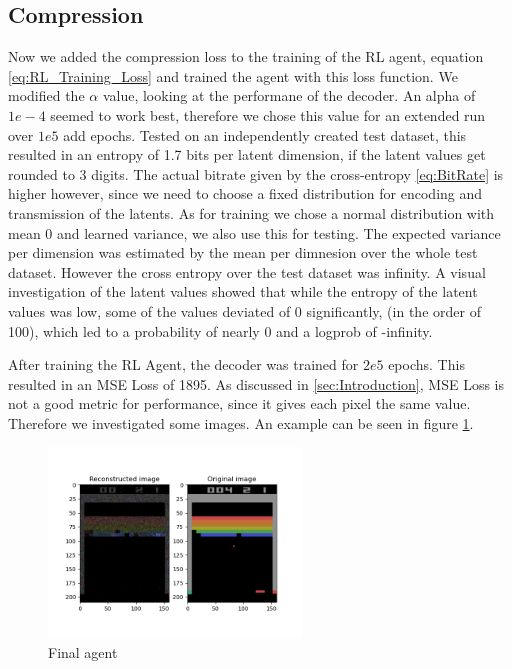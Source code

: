 \subsection{Compression}\label{sub:Results_Compression}
Now we added the compression loss to the training of the RL agent, equation
\ref{eq:RL_Training_Loss} and trained the agent with this loss function. We
modified the $\alpha$ value, looking at the performane of the decoder. An alpha
of $1e-4$ seemed to work best, therefore we chose this value for an
extended run over $1e5$ add epochs. Tested on an independently created test
dataset, this resulted in an entropy of 1.7 bits per latent dimension, if the
latent values get rounded to 3 digits. The actual bitrate given by the
cross-entropy \ref{eq:BitRate} is higher however, since we need to choose a
fixed distribution for encoding and transmission of the latents. As for training
we chose a normal distribution with mean 0 and learned variance, we also use
this for testing. The expected variance per dimension was estimated by the mean
per dimnesion over the whole test dataset. However the cross entropy over the
test dataset was infinity. A visual investigation of the latent values showed
that while the entropy of the latent values was low, some of the values deviated
of 0 significantly, (in the order of 100), which led to a probability of nearly
0 and a logprob of -infinity.

After training the RL Agent, the decoder was trained for $2e5$ epochs. This
resulted in an MSE Loss of 1895. As discussed in \ref{sec:Introduction}, MSE
Loss is not a good metric for performance, since it gives each pixel the same
value. Therefore we investigated some images. An example can be seen in figure
\ref{fig:final_agent}.
\begin{figure}[H]
    \centering
    \includegraphics[width=0.6\textwidth]{images/orig_reconstructed_final_agent.png}
    \caption{Final agent}
    \label{fig:final_agent}
\end{figure}

